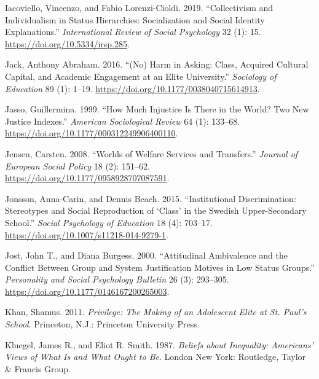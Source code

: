 \documentclass[
  letterpaper,
  DIV=11,
  numbers=noendperiod]{scrartcl}
\newlength{\cslhangindent}
\newlength{\cslentryspacingunit} %
\newenvironment{CSLReferences}[2] %
 {%
  \setlength{\parindent}{0pt}
  \ifodd #1
  \let\oldpar\par
  \def\par{\hangindent=\cslhangindent\oldpar}
  \fi
  \setlength{\parskip}{#2\cslentryspacingunit}
 }%
 {}
\begin{document}
\begin{CSLReferences}{1}{0}
\leavevmode{}%
Iacoviello, Vincenzo, and Fabio Lorenzi-Cioldi. 2019. {``Collectivism
and {Individualism} in {Status Hierarchies}: {Socialization} and {Social
Identity Explanations}.''} \emph{International Review of Social
Psychology} 32 (1): 15. \url{https://doi.org/10.5334/irsp.285}.

\leavevmode{}%
Jack, Anthony Abraham. 2016. {``({No}) {Harm} in {Asking}: {Class},
{Acquired Cultural Capital}, and {Academic Engagement} at an {Elite
University}.''} \emph{Sociology of Education} 89 (1): 1--19.
\url{https://doi.org/10.1177/0038040715614913}.

\leavevmode{}%
Jasso, Guillermina. 1999. {``How {Much Injustice} Is {There} in the
{World}? {Two New Justice Indexes}.''} \emph{American Sociological
Review} 64 (1): 133--68.
\url{https://doi.org/10.1177/000312249906400110}.

\leavevmode{}%
Jensen, Carsten. 2008. {``Worlds of Welfare Services and Transfers.''}
\emph{Journal of European Social Policy} 18 (2): 151--62.
\url{https://doi.org/10.1177/0958928707087591}.

\leavevmode{}%
Jonsson, Anna-Carin, and Dennis Beach. 2015. {``Institutional
Discrimination: {Stereotypes} and Social Reproduction of {`Class'} in
the {Swedish} Upper-Secondary School.''} \emph{Social Psychology of
Education} 18 (4): 703--17.
\url{https://doi.org/10.1007/s11218-014-9279-1}.

\leavevmode{}%
Jost, John T., and Diana Burgess. 2000. {``Attitudinal {Ambivalence} and
the {Conflict} Between {Group} and {System Justification Motives} in
{Low Status Groups}.''} \emph{Personality and Social Psychology
Bulletin} 26 (3): 293--305.
\url{https://doi.org/10.1177/0146167200265003}.

\leavevmode{}%
Khan, Shamus. 2011. \emph{Privilege: {The Making} of an {Adolescent
Elite} at {St}. {Paul}'s {School}}. Princeton, N.J.: Princeton
University Press.

\leavevmode{}%
Kluegel, James R., and Eliot R. Smith. 1987. \emph{Beliefs about
Inequality: {Americans}' Views of What Is and What Ought to Be}. London
New York: Routledge, Taylor \& Francis Group.


\end{CSLReferences}
\end{document}
